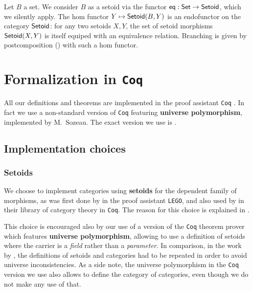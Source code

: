 \documentclass{amsart}
\newcommand{\fat}[1]{\textbf{#1}}
\begin{document}
\begin{example}
  Let $B$ a set. We consider $B$ as a setoid via the functor $\mathsf{eq}:\mathsf{Set}\to\mathsf{Setoid}$, which we silently apply.
  The hom functor $Y \mapsto \mathsf{Setoid}(B,Y)$ is an endofunctor on the category $\mathsf{Setoid}$: for any two setoids $X,Y$, 
   the set of setoid morphisms $\mathsf{Setoid}(X,Y)$ is itself equiped with an equivalence relation.
   Branching is given by postcomposition () with such a hom functor.
\end{example}





\section{Formalization in \texttt{Coq}}\label{sec:formal}

All our definitions and theorems are implemented in the proof assistant \texttt{Coq} \parencite{coq}.
In fact we use a non-standard version of \texttt{Coq} featuring \fat{universe polymorphism}, implemented by 
M.\ Sozeau.
The exact version we use is \parencite{coq_polymorphic}.

\subsection{Implementation choices}



\subsubsection{Setoids}

We choose to implement categories using \fat{setoids} for the dependent family of morphisms, as was first done by
\textcite{aczel_galois} in the proof assistant \texttt{LEGO}, and also used by \textcite{concat} in their library
of category theory in \texttt{Coq}.
The reason for this choice is explained in \parencite[Sec.\ 3.1.2]{ahrens_zsido}.

This choice is encouraged also by our use of a version of the \texttt{Coq} theorem prover which features \fat{universe polymorphism},
allowing to use a definition of setoids where the carrier is a \emph{field} rather than a \emph{parameter}.
In comparison, in the work by \textcite{concat}, the definitions of setoids and categories had to be repeated in order to avoid
universe inconsistencies.
As a side note, the universe polymorphism in the \texttt{Coq} version we use also allows to define the category of categories, even though
we do not make any use of that.
\end{document}

